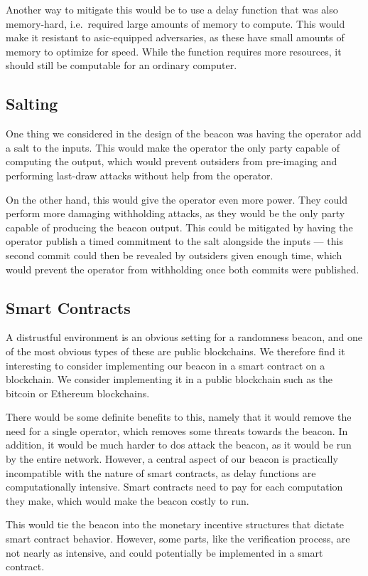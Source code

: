 Another way to mitigate this would be to use a delay function that was also memory-hard, i.e.\ required large amounts of memory to compute.
This would make it resistant to \gls{asic}-equipped adversaries, as these have small amounts of memory to optimize for speed.
While the function requires more resources, it should still be computable for an ordinary computer.

\subsection{Salting}
One thing we considered in the design of the beacon was having the operator add a salt to the inputs.
This would make the operator the only party capable of computing the output, which would prevent outsiders from pre-imaging and performing last-draw attacks without help from the operator.

On the other hand, this would give the operator even more power.
They could perform more damaging withholding attacks, as they would be the only party capable of producing the beacon output.
This could be mitigated by having the operator publish a timed commitment to the salt alongside the inputs --- this second commit could then be revealed by outsiders given enough time, which would prevent the operator from withholding once both commits were published.

\subsection{Smart Contracts}
A distrustful environment is an obvious setting for a randomness beacon, and one of the most obvious types of these are public blockchains.
We therefore find it interesting to consider implementing our beacon in a smart contract on a blockchain. We consider implementing it in a public blockchain such as the bitcoin or Ethereum blockchains.

There would be some definite benefits to this, namely that it would remove the need for a single operator, which removes some threats towards the beacon.
In addition, it would be much harder to \gls{dos} attack the beacon, as it would be run by the entire network.
However, a central aspect of our beacon is practically incompatible with the nature of smart contracts, as delay functions are computationally intensive.
Smart contracts need to pay for each computation they make, which would make the beacon costly to run.

This would tie the beacon into the monetary incentive structures that dictate smart contract behavior.
However, some parts, like the verification process, are not nearly as intensive, and could potentially be implemented in a smart contract.

